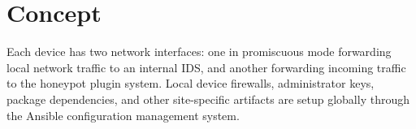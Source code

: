 \section*{\color{NavyBlue}Concept}

\large

\begin{center}
{
\scalebox{1.65}{}
}
\label{fig:concept}

\end{center}
\vspace{2cm}

Each device has two network interfaces: one in promiscuous mode forwarding
local network traffic to an internal IDS, and another forwarding incoming
traffic to the honeypot plugin system. Local device firewalls, administrator
keys, package dependencies, and other site-specific artifacts are setup
globally through the Ansible configuration management system.
